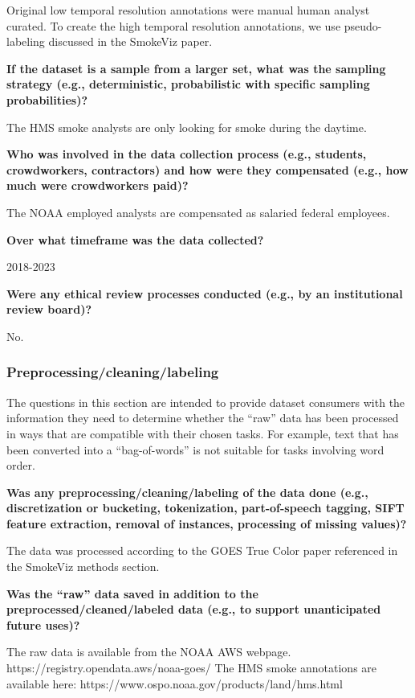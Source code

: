 \documentclass{article}
\begin{document}
Original low temporal resolution annotations were manual human analyst curated. To create the high temporal resolution annotations, we use pseudo-labeling discussed in the SmokeViz paper.

\textbf{If the dataset is a sample from a larger set, what was the sampling strategy (e.g., deterministic, probabilistic with specific sampling probabilities)?}

The HMS smoke analysts are only looking for smoke during the daytime.

\textbf{Who was involved in the data collection process (e.g., students, crowdworkers, contractors) and how were they compensated (e.g., how much were crowdworkers paid)?}

The NOAA employed analysts are compensated as salaried federal employees.

\textbf{Over what timeframe was the data collected?}

2018-2023

\textbf{Were any ethical review processes conducted (e.g., by an institutional review board)?}

No.


\subsubsection{Preprocessing/cleaning/labeling}


The questions in this section are intended to provide dataset consumers with the information they need to determine whether the “raw” data has been processed in ways that are compatible with their chosen tasks. For example, text that has been converted into a “bag-of-words” is not suitable for tasks involving word order.

\textbf{Was any preprocessing/cleaning/labeling of the data done (e.g., discretization or bucketing, tokenization, part-of-speech tagging, SIFT feature extraction, removal of instances, processing of missing values)?}

The data was processed according to the GOES True Color paper referenced in the SmokeViz methods section.

\textbf{Was the “raw” data saved in addition to the preprocessed/cleaned/labeled data (e.g., to support unanticipated future uses)?}

The raw data is available from the NOAA AWS webpage.
https://registry.opendata.aws/noaa-goes/
The HMS smoke annotations are available here:
https://www.ospo.noaa.gov/products/land/hms.html
\end{document}
